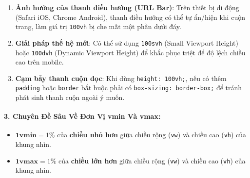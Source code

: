 \documentclass[11pt,oneside]{book}
\newcommand{\thd}[1]{\textcolor{white}{\textbf{\strut #1}}}
\newcommand{\codeinline}[1]{\textcolor{accentOrange}{\texttt{#1}}}
\begin{document}
\begin{warnBox}
\begin{enumerate}[leftmargin=1.5em, itemsep=3pt, parsep=0pt]
    \item \textbf{Ảnh hưởng của thanh điều hướng (URL Bar)}: Trên thiết bị di động (Safari iOS, Chrome Android), thanh điều hướng có thể tự ẩn/hiện khi cuộn trang, làm giá trị \codeinline{100vh} bị che mất một phần dưới đáy.
    \item \textbf{Giải pháp thế hệ mới}: Có thể sử dụng \codeinline{100svh} (Small Viewport Height) hoặc \codeinline{100dvh} (Dynamic Viewport Height) để khắc phục triệt để độ lệch chiều cao trên mobile.
    \item \textbf{Cạm bẫy thanh cuộn dọc}: Khi dùng \codeinline{height: 100vh;}, nếu có thêm \codeinline{padding} hoặc \codeinline{border} bắt buộc phải có \codeinline{box-sizing: border-box;} để tránh phát sinh thanh cuộn ngoài ý muốn.
\end{enumerate}
\end{warnBox}

\paragraph{3. Chuyên Đề Sâu Về Đơn Vị vmin Và vmax:}

\begin{conceptBox}
\begin{itemize}[leftmargin=1.5em, itemsep=3pt, parsep=0pt]
    \item $\mathbf{1\text{vmin}} = 1\%$ của \textbf{chiều nhỏ hơn} giữa chiều rộng (\codeinline{vw}) và chiều cao (\codeinline{vh}) của khung nhìn.
    \item $\mathbf{1\text{vmax}} = 1\%$ của \textbf{chiều lớn hơn} giữa chiều rộng (\codeinline{vw}) và chiều cao (\codeinline{vh}) của khung nhìn.
\end{itemize}
\end{conceptBox}

\begin{prettyTableBox}
\sffamily\small
{}
\end{prettyTableBox}
\end{document}

